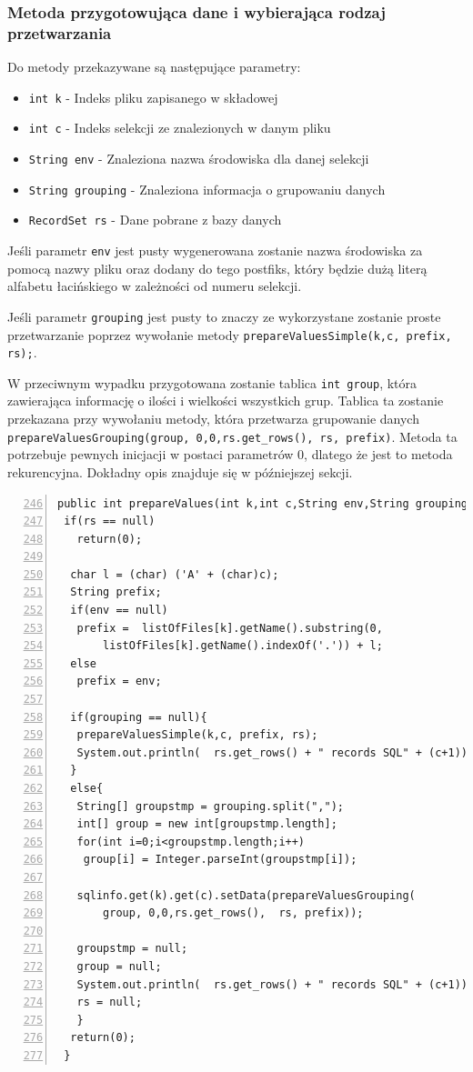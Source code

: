 \subsubsection*{Metoda przygotowująca dane i wybierająca rodzaj przetwarzania}

Do metody przekazywane są następujące parametry:
\begin{itemize}
\item \texttt{int k} - Indeks pliku zapisanego w składowej
\item \texttt{int c} - Indeks selekcji ze znalezionych w danym pliku
\item\texttt{String  env} - Znaleziona nazwa środowiska dla danej selekcji
\item \texttt{String  grouping} - Znaleziona informacja o grupowaniu danych
\item \texttt{RecordSet rs} - Dane pobrane z bazy danych
\end{itemize}
\vspace{5mm}
Jeśli parametr \texttt{env} jest pusty wygenerowana zostanie nazwa środowiska za pomocą nazwy pliku oraz dodany do tego postfiks, który będzie dużą literą alfabetu łacińskiego w zależności od numeru selekcji. 
\par
Jeśli parametr \texttt{grouping} jest pusty to znaczy ze wykorzystane zostanie proste przetwarzanie poprzez wywołanie metody \texttt{prepareValuesSimple(k,c, prefix, rs);}.
\par
 W przeciwnym wypadku przygotowana zostanie tablica \texttt{int group}, 
 która zawierająca informację o ilości i wielkości wszystkich grup. Tablica ta zostanie przekazana przy wywołaniu metody, która
 przetwarza grupowanie danych \texttt{prepareValuesGrouping(group, 0,0,rs.get\_rows(),  rs, prefix)}. Metoda ta potrzebuje pewnych inicjacji w postaci parametrów 0, dlatego że jest to metoda rekurencyjna. Dokładny opis znajduje się w późniejszej sekcji.
 
 \begin{lstlisting}[numbers=left,firstnumber=246]
public int prepareValues(int k,int c,String env,String grouping,RecordSet rs){
 if(rs == null)
   return(0);

  char l = (char) ('A' + (char)c);
  String prefix;
  if(env == null)
   prefix =  listOfFiles[k].getName().substring(0,
	   listOfFiles[k].getName().indexOf('.')) + l;
  else
   prefix = env;
      
  if(grouping == null){
   prepareValuesSimple(k,c, prefix, rs);
   System.out.println(  rs.get_rows() + " records SQL" + (c+1));  
  }
  else{
   String[] groupstmp = grouping.split(",");
   int[] group = new int[groupstmp.length];
   for(int i=0;i<groupstmp.length;i++)
    group[i] = Integer.parseInt(groupstmp[i]);
           
   sqlinfo.get(k).get(c).setData(prepareValuesGrouping(
	   group, 0,0,rs.get_rows(),  rs, prefix)); 
          
   groupstmp = null;
   group = null;
   System.out.println(  rs.get_rows() + " records SQL" + (c+1));   
   rs = null;
   }
  return(0);  
 }
  \end{lstlisting}


